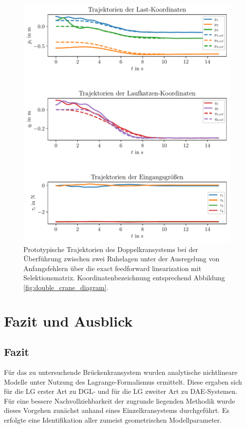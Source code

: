 \begin{figure}[ht]
	\begin{center}
		\includegraphics[scale=1]{Pictures/feedforward_lin_selec_controller_initial_error}
	\end{center}
	\caption[Trajektorien Ruhelagenüberführung mit Regelung über exact feedforward linearization (Selektionsmatrix)]
	{Prototypische Trajektorien des Doppelkransystems bei der Überführung zwischen zwei Ruhelagen unter der Ausregelung von Anfangsfehlern über die exact feedforward linearization mit Selektionsmatrix. Koordinatenbezeichnung entsprechend Abbildung \ref{fig:double_crane_diagram}.}
	\label{fig_feedforward_selec_controller_initial_error}
\end{figure}

\chapter{Fazit und Ausblick}
\section{Fazit}
Für das zu untersuchende Brückenkransystem wurden analytische nichtlineare Modelle unter Nutzung des Lagrange-Formalismus ermittelt. Diese ergaben sich für die LG erster Art zu DGL- und für die LG zweiter Art zu DAE-Systemen. Für eine bessere Nachvollziehbarkeit der zugrunde liegenden Methodik wurde dieses Vorgehen zunächst anhand eines Einzelkransystems durchgeführt. Es erfolgte eine Identifikation aller zumeist geometrischen Modellparameter.

